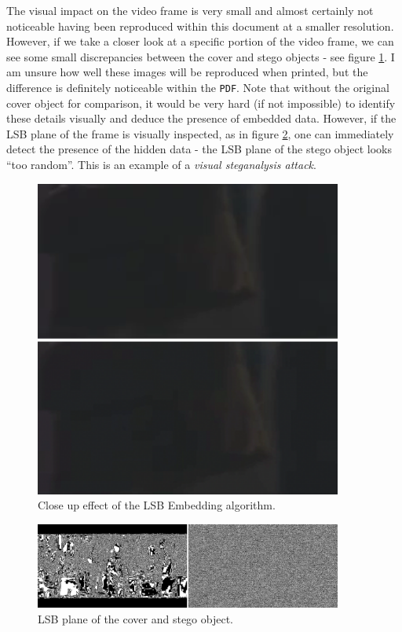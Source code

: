 \documentclass[paper=a4, fontsize=11pt,twoside]{scrartcl}
\numberwithin{table}{section}
\numberwithin{figure}{section}
\numberwithin{algorithm}{section}
\begin{document}
\noindent
The visual impact on the video frame is very small and almost certainly not noticeable having been reproduced within this document at a smaller resolution. However, if we take a closer look at a specific portion of the video frame, we can see some small discrepancies between the cover and stego objects - see figure \ref{lsbcloseup}. I am unsure how well these images will be reproduced when printed, but the difference is definitely noticeable within the \texttt{PDF}. Note that without the original cover object for comparison, it would be very hard (if not impossible) to identify these details visually and deduce the presence of embedded data. However, if the LSB plane of the frame is visually inspected, as in figure \ref{lsbemb}, one can immediately detect the presence of the hidden data - the LSB plane of the stego object looks ``too random''. This is an example of a \textit{visual steganalysis attack}.


\begin{figure}
\centerline{\includegraphics[width=0.9\textwidth]{images/closeup_3.png}}
\caption{Close up effect of the LSB Embedding algorithm.}
\label{lsbcloseup}
\end{figure}


\begin{figure}
\centerline{\includegraphics[width=0.9\textwidth]{images/lsb_emb.png}}
\caption{LSB plane of the cover and stego object.}
\label{lsbemb}
\end{figure}
\end{document}
